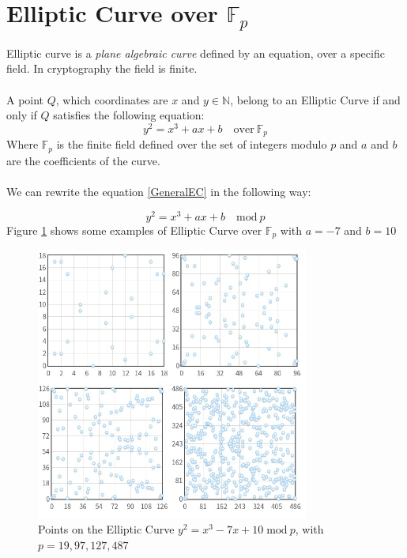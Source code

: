 \section{Elliptic Curve over $\mathbb{F}_p$}
Elliptic curve is a \textit{plane algebraic curve} defined by an equation, over a specific field. In cryptography the field is finite.
\\ \\
A point $Q$, which coordinates are $x$ and $y\in \mathbb{N}$, belong to an Elliptic Curve if and only if $Q$ satisfies the following equation:
\begin{equation}\label{GeneralEC}
y^2=x^3+ax+b \quad \textrm{over} \ \mathbb{F}_p
\end{equation}
Where $\mathbb{F}_p$ is the finite field defined over the set of integers modulo $p$ and $a$ and $b$ are the coefficients of the curve. \\ \\
We can rewrite the equation \ref{GeneralEC} in the following way:

\begin{equation}\label{GeneralECmodp}
y^2=x^3+ax+b \quad \textrm{mod} \ p
\end{equation}
Figure \ref{fig:EC_ex} shows some examples of Elliptic Curve over $\mathbb{F}_p$ with $a=-7$ and $b=10$
\begin{figure}[ht!]
	\centering
	\includegraphics[width=9cm]{Figures/EC_ex.jpg}
	\caption{Points on the Elliptic Curve $y^2=x^3-7x+10 \; \textrm{mod} \ p$, with $p=19,97,127,487$ }
	\label{fig:EC_ex}
\end{figure}

